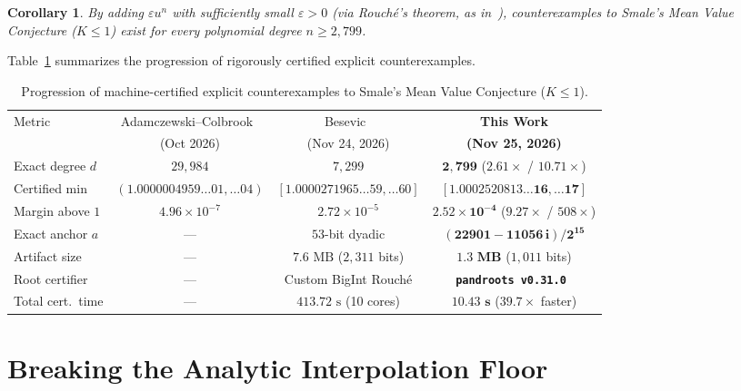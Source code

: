 \documentclass[11pt,a4paper]{amsart}
\newtheorem{corollary}[theorem]{Corollary}
\theoremstyle{remark}
\begin{document}
\begin{corollary}
By adding $\varepsilon u^n$ with sufficiently small $\varepsilon > 0$ (via
Rouch\'e's theorem, as in~\cite{AC26}), counterexamples to Smale's Mean Value
Conjecture ($K \le 1$) exist for every polynomial degree $n \ge 2{,}799$.
\end{corollary}

Table~\ref{tab:comparison} summarizes the progression of rigorously certified
explicit counterexamples.

\begin{table}[h]
\centering
\footnotesize
\setlength{\tabcolsep}{4pt}
\caption{Progression of machine-certified explicit counterexamples to Smale's
Mean Value Conjecture ($K \le 1$).}
\label{tab:comparison}
\begin{tabular}{@{}lccc@{}}
\toprule
Metric & Adamczewski--Colbrook~\cite{AC26} & Besevic~\cite{Besevic7299} & \textbf{This Work} \\
       & (Oct 2026) & (Nov 24, 2026) & \textbf{(Nov 25, 2026)} \\
\midrule
Exact degree $d$ & $29{,}984$ & $7{,}299$ & $\mathbf{2{,}799}$ ($2.61\times$ / $10.71\times$) \\
Certified min & $(1.0000004959\ldots 01,\ldots 04)$ & $[1.0000271965\ldots 59, \ldots 60]$ & $\mathbf{[1.0002520813\ldots 16, \ldots 17]}$ \\
Margin above $1$ & $4.96 \times 10^{-7}$ & $2.72 \times 10^{-5}$ & $\mathbf{2.52 \times 10^{-4}}$ ($9.27\times$ / $508\times$) \\
Exact anchor $a$ & --- & $53$-bit dyadic & $\mathbf{(22901 - 11056\,i)/2^{15}}$ \\
Artifact size & --- & $7.6\text{ MB}$ ($2{,}311$ bits) & $\mathbf{1.3\text{ MB}}$ ($1{,}011$ bits) \\
Root certifier & --- & Custom BigInt Rouch\'e & \textbf{\texttt{pandroots v0.31.0}}~\cite{pandroots} \\
Total cert.\ time & --- & $413.72\text{ s}$ (10 cores) & $\mathbf{10.43\text{ s}}$ ($39.7\times$ faster) \\
\bottomrule
\end{tabular}
\end{table}

\section{Breaking the Analytic Interpolation Floor}
\end{document}
